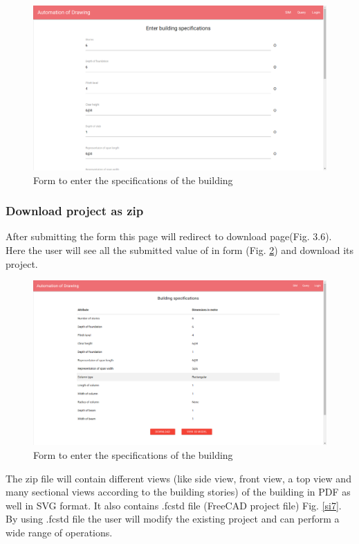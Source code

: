 \begin{figure}[h!]
\begin{center}
\includegraphics[scale=0.35]{images/auto_drawing.png}
\caption{Form to enter the specifications of the building}
\label{si5}  
\end{center}
\end{figure}

\subsubsection{Download project as zip}
After submitting the form this page will redirect to download page(Fig. 3.6). Here the user will see all the submitted value of in form (Fig. \ref{si6}) and download its project.
\begin{figure}[h!]
\begin{center}
\includegraphics[scale=0.35]{images/b_specs.png}
\caption{Form to enter the specifications of the building}
\label{si6}  
\end{center}
\end{figure}
The zip file will contain different views (like side view, front view, a top view and many sectional views according to the building stories) of the building in PDF as well in SVG format. It also contains .fcstd file (FreeCAD project file) Fig. \ref{si7}. By using .fcstd file the user will modify the existing project and can perform a wide range of operations.

